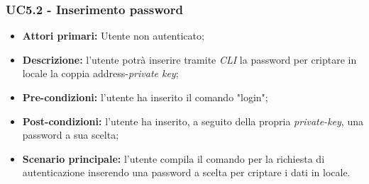 \subsubsection{UC5.2 - Inserimento password}
\begin{itemize}
	\item \textbf{Attori primari:} Utente non autenticato;
	\item \textbf{Descrizione:} l'utente potrà inserire tramite \textit{CLI\glo} la password per criptare in locale la coppia address-\textit{private key\glos}; 
	\item \textbf{Pre-condizioni:} l'utente ha inserito il comando "login";
	\item \textbf{Post-condizioni:} l'utente ha inserito, a seguito della propria \textit{private-key\glo}, una password a sua scelta;
	\item \textbf{Scenario principale:} l'utente compila il comando per la richiesta di autenticazione inserendo una password a scelta per criptare i dati in locale.
\end{itemize}
